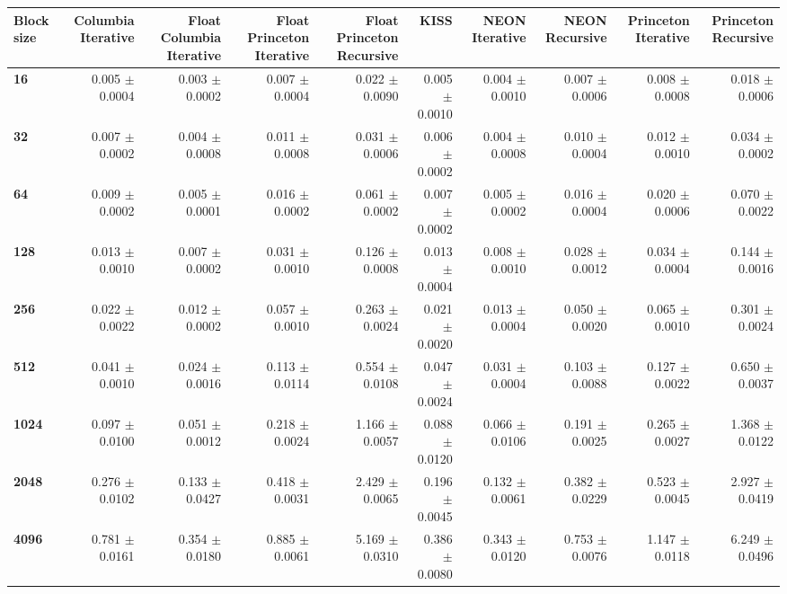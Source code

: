 \begin{tabular}{lrrrrrrrrr}\toprule
\textbf{Block size}  & \textbf{Columbia Iterative} & \textbf{Float Columbia Iterative} & \textbf{Float Princeton Iterative} & \textbf{Float Princeton Recursive} & \textbf{KISS} & \textbf{NEON Iterative} & \textbf{NEON Recursive} & \textbf{Princeton Iterative} & \textbf{Princeton Recursive}\\\midrule
\textbf{16}  & 0.005 $\pm$ 0.0004 & 0.003 $\pm$ 0.0002 & 0.007 $\pm$ 0.0004 & 0.022 $\pm$ 0.0090 & 0.005 $\pm$ 0.0010 & 0.004 $\pm$ 0.0010 & 0.007 $\pm$ 0.0006 & 0.008 $\pm$ 0.0008 & 0.018 $\pm$ 0.0006\\
\textbf{32}  & 0.007 $\pm$ 0.0002 & 0.004 $\pm$ 0.0008 & 0.011 $\pm$ 0.0008 & 0.031 $\pm$ 0.0006 & 0.006 $\pm$ 0.0002 & 0.004 $\pm$ 0.0008 & 0.010 $\pm$ 0.0004 & 0.012 $\pm$ 0.0010 & 0.034 $\pm$ 0.0002\\
\textbf{64}  & 0.009 $\pm$ 0.0002 & 0.005 $\pm$ 0.0001 & 0.016 $\pm$ 0.0002 & 0.061 $\pm$ 0.0002 & 0.007 $\pm$ 0.0002 & 0.005 $\pm$ 0.0002 & 0.016 $\pm$ 0.0004 & 0.020 $\pm$ 0.0006 & 0.070 $\pm$ 0.0022\\
\textbf{128}  & 0.013 $\pm$ 0.0010 & 0.007 $\pm$ 0.0002 & 0.031 $\pm$ 0.0010 & 0.126 $\pm$ 0.0008 & 0.013 $\pm$ 0.0004 & 0.008 $\pm$ 0.0010 & 0.028 $\pm$ 0.0012 & 0.034 $\pm$ 0.0004 & 0.144 $\pm$ 0.0016\\
\textbf{256}  & 0.022 $\pm$ 0.0022 & 0.012 $\pm$ 0.0002 & 0.057 $\pm$ 0.0010 & 0.263 $\pm$ 0.0024 & 0.021 $\pm$ 0.0020 & 0.013 $\pm$ 0.0004 & 0.050 $\pm$ 0.0020 & 0.065 $\pm$ 0.0010 & 0.301 $\pm$ 0.0024\\
\textbf{512}  & 0.041 $\pm$ 0.0010 & 0.024 $\pm$ 0.0016 & 0.113 $\pm$ 0.0114 & 0.554 $\pm$ 0.0108 & 0.047 $\pm$ 0.0024 & 0.031 $\pm$ 0.0004 & 0.103 $\pm$ 0.0088 & 0.127 $\pm$ 0.0022 & 0.650 $\pm$ 0.0037\\
\textbf{1024}  & 0.097 $\pm$ 0.0100 & 0.051 $\pm$ 0.0012 & 0.218 $\pm$ 0.0024 & 1.166 $\pm$ 0.0057 & 0.088 $\pm$ 0.0120 & 0.066 $\pm$ 0.0106 & 0.191 $\pm$ 0.0025 & 0.265 $\pm$ 0.0027 & 1.368 $\pm$ 0.0122\\
\textbf{2048}  & 0.276 $\pm$ 0.0102 & 0.133 $\pm$ 0.0427 & 0.418 $\pm$ 0.0031 & 2.429 $\pm$ 0.0065 & 0.196 $\pm$ 0.0045 & 0.132 $\pm$ 0.0061 & 0.382 $\pm$ 0.0229 & 0.523 $\pm$ 0.0045 & 2.927 $\pm$ 0.0419\\
\textbf{4096}  & 0.781 $\pm$ 0.0161 & 0.354 $\pm$ 0.0180 & 0.885 $\pm$ 0.0061 & 5.169 $\pm$ 0.0310 & 0.386 $\pm$ 0.0080 & 0.343 $\pm$ 0.0120 & 0.753 $\pm$ 0.0076 & 1.147 $\pm$ 0.0118 & 6.249 $\pm$ 0.0496\\

\end{tabular}
